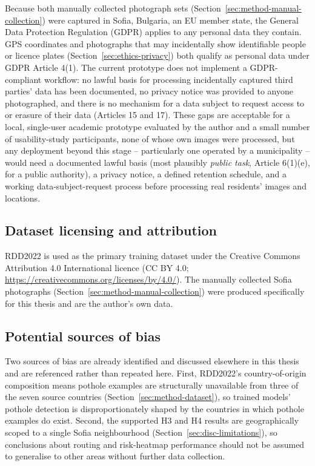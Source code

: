 \documentclass[10pt,a4paper,twocolumn]{article}
\begin{document}
Because both manually collected photograph sets
(Section~\ref{sec:method-manual-collection}) were captured in Sofia,
Bulgaria, an EU member state, the General Data Protection Regulation
(GDPR) applies to any personal data they contain. GPS coordinates and
photographs that may incidentally show identifiable people or licence
plates (Section~\ref{sec:ethics-privacy}) both qualify as personal data
under GDPR Article 4(1). The current prototype does not implement a
GDPR-compliant workflow: no lawful basis for processing incidentally
captured third parties' data has been documented, no privacy notice was
provided to anyone photographed, and there is no mechanism for a data
subject to request access to or erasure of their data (Articles 15 and
17). These gaps are acceptable for a local, single-user academic
prototype evaluated by the author and a small number of usability-study
participants, none of whose own images were processed, but any
deployment beyond this stage -- particularly one operated by a
municipality -- would need a documented lawful basis (most plausibly
\emph{public task}, Article 6(1)(e), for a public authority), a privacy
notice, a defined retention schedule, and a working data-subject-request
process before processing real residents' images and locations.

\subsection{Dataset licensing and attribution}
\label{sec:ethics-licensing}

RDD2022 \citep{arya2024rdd2022,arya2022rdd2022dataset} is used as the primary training dataset
under the Creative Commons Attribution 4.0 International licence (CC BY
4.0; \url{https://creativecommons.org/licenses/by/4.0/}). The manually
collected Sofia photographs (Section~\ref{sec:method-manual-collection})
were produced specifically for this thesis and are the author's own
data.

\subsection{Potential sources of bias}
\label{sec:ethics-bias}

Two sources of bias are already identified and discussed elsewhere in
this thesis and are referenced rather than repeated here. First,
RDD2022's country-of-origin composition means pothole examples are
structurally unavailable from three of the seven source countries
(Section~\ref{sec:method-dataset}), so trained models' pothole detection
is disproportionately shaped by the countries in which pothole examples
do exist. Second, the supported H3 and H4 results are geographically
scoped to a single Sofia neighbourhood (Section~\ref{sec:disc-limitations}),
so conclusions about routing and risk-heatmap performance should not be
assumed to generalise to other areas without further data collection.
\end{document}
